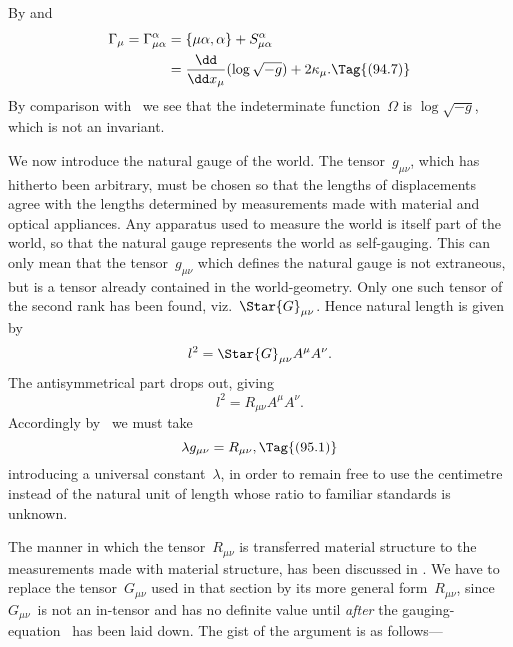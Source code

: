 \documentclass[12pt]{book}
\begin{document}
By  and~
\begin{align*}
  \Gamma_{\mu} = \Gamma_{\mu\alpha}^{\alpha}
  &= \{\mu\alpha, \alpha\} + S_{\mu\alpha}^{\alpha} \\
  &= \frac{\dd}{\dd x_{\mu}} (\log \sqrt{-g}) + 2\kappa_{\mu}.
  \Tag{(94.7)}
\end{align*}
By comparison with~ we see that the indeterminate function~$\Omega$ is
$\log \sqrt{-g}$, which is not an invariant.

%
%

We now introduce the natural gauge of the world. The tensor~$g_{\mu\nu}$, which
has hitherto been arbitrary, must be chosen so that the lengths of displacements
agree with the lengths determined by measurements made with material
and optical appliances. Any apparatus used to measure the world is itself part
of the world, so that the natural gauge represents the world as self\hyp{}gauging.
%
This can only mean that the tensor~$g_{\mu\nu}$ which defines the natural gauge is
not extraneous, but is a tensor already contained in the world\hyp{}geometry. Only
one such tensor of the second rank has been found, viz.~$\Star{G}_{\mu\nu}$. Hence natural
length is given by
\[
l^{2} = \Star{G}_{\mu\nu} A^{\mu} A^{\nu}.
\]
The antisymmetrical part drops out, giving
\[
l^{2} = R_{\mu\nu} A^{\mu} A^{\nu}.
\]
Accordingly by~ we must take
\[
\lambda g_{\mu\nu} = R_{\mu\nu},
\Tag{(95.1)}
\]
introducing a universal constant~$\lambda$, in order to remain free to use the centimetre
instead of the natural unit of length whose ratio to familiar standards
is unknown.

The manner in which the tensor~$R_{\mu\nu}$ is transferred  material structure
to the measurements made with material structure, has been discussed in
. We have to replace the tensor~$G_{\mu\nu}$ used in that section by its more
general form~$R_{\mu\nu}$, since $G_{\mu\nu}$~is not an in\hyp{}tensor and has no definite value
until \emph{after} the gauging\hyp{}equation~ has been laid down. The gist of the
argument is as follows---
\end{document}
